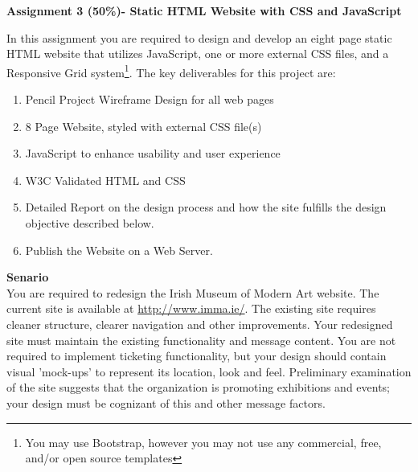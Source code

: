 
	
\begin{flushleft}
\Large\textbf{Assignment 3 (50\%)- Static HTML Website with CSS and JavaScript}\\
\end{flushleft}

In this assignment you are required to design and develop an eight page static HTML website that utilizes JavaScript, one or more external CSS files, and a Responsive Grid system\footnote{You may use Bootstrap, however you may not use any commercial, free, and/or open source templates}. The key deliverables for this project are:

\begin{enumerate}
	\item Pencil Project Wireframe Design for all web pages
	\item 8 Page Website, styled with external CSS file(s)
	\item JavaScript to enhance usability and user experience
	\item W3C Validated HTML and CSS
	\item Detailed Report on the design process and how the site fulfills the design objective described below.
	\item Publish the Website on a Web Server.
\end{enumerate}

\textbf{Senario}\\


You are required to redesign the Irish Museum of Modern Art website.  The current site is available at \href{http://www.imma.ie/}{http://www.imma.ie/}.  The existing site requires cleaner structure, clearer navigation and other improvements.  Your redesigned site must maintain the existing functionality and message content.  You are not required to implement ticketing functionality, but your design should contain visual 'mock-ups' to represent its location, look and feel.  Preliminary examination of the site suggests that the organization is promoting exhibitions and events; your design must be cognizant of this and other message factors.


